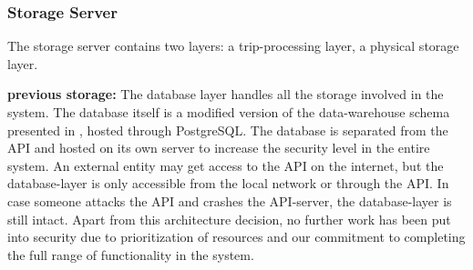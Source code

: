 \subsubsection{Storage Server}
The storage server contains two layers: a trip-processing layer, a physical storage layer.

\textbf{previous storage:}
The database layer handles all the storage involved in the system. The database itself is a modified version of the data-warehouse schema presented in \cite{sw9_report}, hosted through PostgreSQL\cite{postgresql}. The database is separated from the API and hosted on its own server to increase the security level in the entire system. An external entity may get access to the API on the internet, but the database-layer is only accessible from the local network or through the API. In case someone attacks the API and crashes the API-server, the database-layer is still intact. Apart from this architecture decision, no further work has been put into security due to prioritization of resources and our commitment to completing the full range of functionality in the system. 
